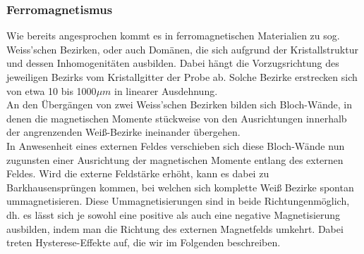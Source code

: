         \subsubsection*{Ferromagnetismus}
            Wie bereits angesprochen kommt es in ferromagnetischen Materialien zu sog. Weiss'schen Bezirken,
            oder auch Domänen, die sich aufgrund der Kristallstruktur und dessen Inhomogenitäten ausbilden. Dabei
            hängt die Vorzugsrichtung des jeweiligen Bezirks vom Kristallgitter der Probe ab. Solche
            Bezirke erstrecken sich von etwa 10 bis 1000$\mu m$ in linearer Ausdehnung.\\
            An den Übergängen von zwei Weiss'schen Bezirken bilden sich Bloch-Wände, in denen die magnetischen Momente stückweise von den Ausrichtungen innerhalb der angrenzenden Weiß-Bezirke ineinander übergehen.\\
            In Anwesenheit eines externen Feldes verschieben sich diese Bloch-Wände nun zugunsten einer Ausrichtung der magnetischen Momente entlang des externen Feldes. Wird die externe Feldstärke erhöht,
            kann es dabei zu Barkhausensprüngen kommen, bei welchen sich komplette Weiß Bezirke spontan ummagnetisieren. Diese Ummagnetisierungen sind in beide \dq Richtungen\dq möglich, dh. es lässt sich je sowohl eine positive als auch eine negative Magnetisierung ausbilden,
            indem man die Richtung des externen Magnetfelds umkehrt. Dabei treten Hysterese-Effekte auf, die wir im Folgenden beschreiben.
